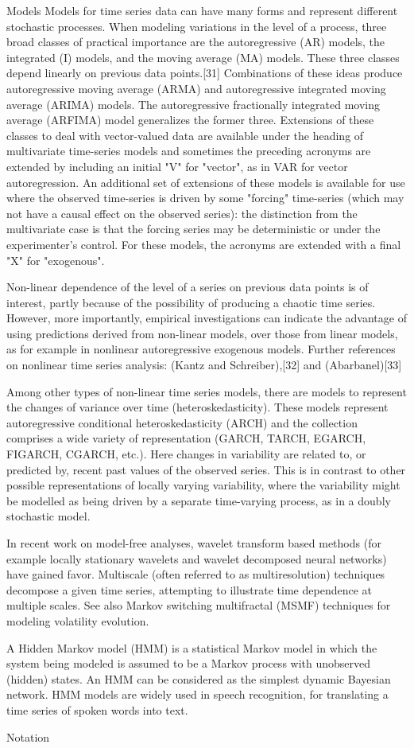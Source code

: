 Models
Models for time series data can have many forms and represent different stochastic processes. When modeling variations in the level of a process, three broad classes of practical importance are the autoregressive (AR) models, the integrated (I) models, and the moving average (MA) models. These three classes depend linearly on previous data points.[31] Combinations of these ideas produce autoregressive moving average (ARMA) and autoregressive integrated moving average (ARIMA) models. The autoregressive fractionally integrated moving average (ARFIMA) model generalizes the former three. Extensions of these classes to deal with vector-valued data are available under the heading of multivariate time-series models and sometimes the preceding acronyms are extended by including an initial "V" for "vector", as in VAR for vector autoregression. An additional set of extensions of these models is available for use where the observed time-series is driven by some "forcing" time-series (which may not have a causal effect on the observed series): the distinction from the multivariate case is that the forcing series may be deterministic or under the experimenter's control. For these models, the acronyms are extended with a final "X" for "exogenous".

Non-linear dependence of the level of a series on previous data points is of interest, partly because of the possibility of producing a chaotic time series. However, more importantly, empirical investigations can indicate the advantage of using predictions derived from non-linear models, over those from linear models, as for example in nonlinear autoregressive exogenous models. Further references on nonlinear time series analysis: (Kantz and Schreiber),[32] and (Abarbanel)[33]

Among other types of non-linear time series models, there are models to represent the changes of variance over time (heteroskedasticity). These models represent autoregressive conditional heteroskedasticity (ARCH) and the collection comprises a wide variety of representation (GARCH, TARCH, EGARCH, FIGARCH, CGARCH, etc.). Here changes in variability are related to, or predicted by, recent past values of the observed series. This is in contrast to other possible representations of locally varying variability, where the variability might be modelled as being driven by a separate time-varying process, as in a doubly stochastic model.

In recent work on model-free analyses, wavelet transform based methods (for example locally stationary wavelets and wavelet decomposed neural networks) have gained favor. Multiscale (often referred to as multiresolution) techniques decompose a given time series, attempting to illustrate time dependence at multiple scales. See also Markov switching multifractal (MSMF) techniques for modeling volatility evolution.

A Hidden Markov model (HMM) is a statistical Markov model in which the system being modeled is assumed to be a Markov process with unobserved (hidden) states. An HMM can be considered as the simplest dynamic Bayesian network. HMM models are widely used in speech recognition, for translating a time series of spoken words into text.

Notation